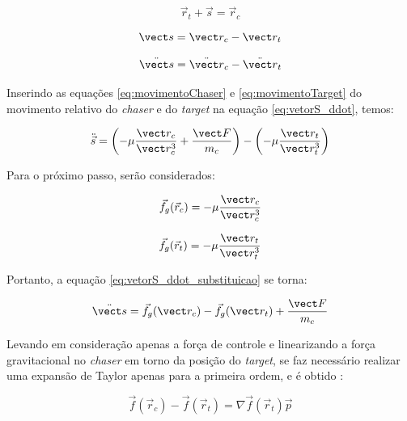 \begin{equation}
\vec r_t + \vec s = \vec r_c
\end{equation}

\begin{equation}
\label{eq:vetorS}
\vect s = \vect r_{c} - \vect r_{t}
\end{equation}

\begin{equation}
\label{eq:vetorS_ddot}
\ddot{\vect s} = \ddot{\vect r}_{c} - \ddot{\vect r}_{t}
\end{equation}

Inserindo as equações \eqref{eq:movimentoChaser} e \eqref{eq:movimentoTarget} do movimento relativo do \emph{chaser} e do \emph{target} na equação \eqref{eq:vetorS_ddot}, temos:

\begin{equation}
\label{eq:vetorS_ddot_substituicao}
\ddot{\vec s} = \left(-\mu \frac{\vect r_c}{\vect r_{c}^3} + \frac{\vect F}{m_c}\right) - \left(-\mu \frac{\vect r_t}{\vect r_t^3}\right)
\end{equation}

Para o próximo passo, serão considerados:

\begin{equation}
    \label{eq:fg_rc}
\vec f_g(\vec r_c) = -\mu \frac{\vect r_c}{\vect r_{c}^3}
\end{equation}

\begin{equation}
    \label{eq:fg_rt}
\vec f_g(\vec r_t) = -\mu \frac{\vect r_t}{\vect r_{t}^3}
\end{equation}

Portanto, a equação \eqref{eq:vetorS_ddot_substituicao} se torna:

\begin{equation}
\label{eq:fg_rc_fg_rt}
\ddot{\vect s} = \vec f_g(\vect r_c) - \vec f_g(\vect r_t) + \frac{\vect F}{m_c}
\end{equation}

Levando em consideração apenas a força de controle e linearizando a força gravitacional no \emph{chaser} em torno da posição do \emph{target}, se faz necessário realizar uma expansão de Taylor apenas para a primeira ordem, e é obtido \cite{arantes2011}:

\begin{equation}
\label{eq:linearizandoJacobiana}
\vec f(\vec r_c) - \vec f(\vec r_t) = \nabla \vec f(\vec r_t)\vec p
\end{equation}

